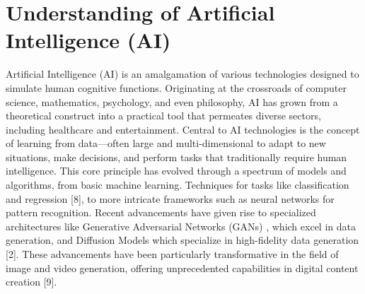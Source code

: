 \documentclass[11pt,a4paper,oneside]{report}
\begin{document}
\section{Understanding of Artificial Intelligence (AI)}
Artificial Intelligence (AI) is an amalgamation of various technologies designed to simulate human cognitive functions. 
Originating at the crossroads of computer science, mathematics, psychology, and even philosophy, 
AI has grown from a theoretical construct into a practical tool that permeates diverse sectors, 
including healthcare and entertainment. 
Central to AI technologies is the concept of learning from data—often large and multi-dimensional to adapt to new situations, make decisions, and perform tasks that traditionally require human intelligence. 
This core principle has evolved through a spectrum of models and algorithms, from basic machine learning. 
Techniques for tasks like classification and regression [8], to more intricate frameworks such as neural networks for pattern recognition. 
Recent advancements have given rise to specialized architectures like Generative Adversarial Networks (GANs) \cite{granot2022drop}, which excel in data generation, and Diffusion Models which specialize in high-fidelity data generation [2]. 
These advancements have been particularly transformative in the field of image and video generation, offering unprecedented capabilities in digital content creation [9]. 
\end{document}
